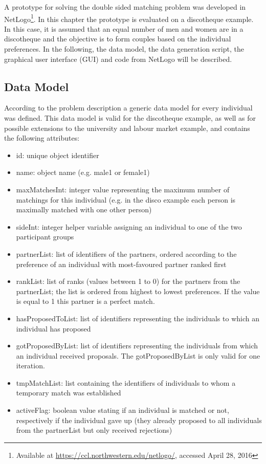 \label{prototype}
A prototype for solving the double sided matching problem was developed in NetLogo\footnote{Available at \url{https://ccl.northwestern.edu/netlogo/}, accessed April 28, 2016}.
In this chapter the prototype is evaluated on a discotheque example. 
In this case, it is assumed that an equal number of men and women are in a discotheque and the objective is to form couples based on the individual preferences.
In the following, the data model, the data generation script, the graphical user interface (GUI) and code from NetLogo will be described.

\subsection{Data Model}
According to the problem description a generic data model for every individual was defined.
This data model is valid for the discotheque example, as well as for possible extensions to the university and labour market example, and contains the following attributes:
\begin{itemize}
	\item id: unique object identifier
	\item name: object name (e.g. male1 or female1)
	\item maxMatchesInt: integer value representing the maximum number of matchings for this individual (e.g. in the disco example each person is maximally matched with one other person)
	\item sideInt: integer helper variable assigning an individual to one of the two participant groups
	\item partnerList: list of identifiers of the partners, ordered according to the preference of an individual with most-favoured partner ranked first
	\item rankList: list of ranks (values between 1 to 0) for the partners from the partnerList; the list is ordered from highest to lowest preferences.
	If the value is equal to 1 this partner is a perfect match.
	\item hasProposedToList: list of identifiers representing the individuals to which an individual has proposed
	\item gotProposedByList: list of identifiers representing the individuals from which an individual received proposals.
	The gotProposedByList is only valid for one iteration.
	\item tmpMatchList: list containing the identifiers of individuals to whom a temporary match was established
	\item activeFlag: boolean value stating if an individual is matched or not, respectively if the individual gave up (they already proposed to all individuals from the partnerList but only received rejections)
\end{itemize}

